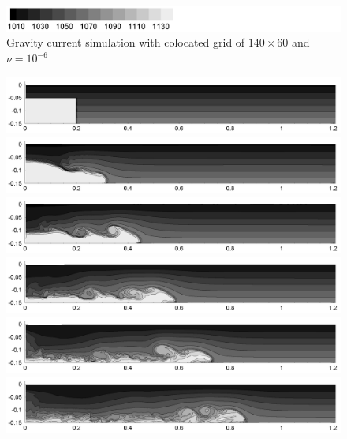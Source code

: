 \begin{figure}[htbp]
\begin{center}
\includegraphics[scale=0.55]{../figures/colocated/Fig9case/label.png}
    \caption{Gravity current simulation with colocated grid of $140 \times 60$ and $\nu=10^{-6}$}
    \label{fig:140-60-03-VE-6}
  \end{center}
\end{figure}



\begin{figure}[htbp]
  \begin{center}    \includegraphics[scale=0.55]{../figures/colocated/Fig9case/280-120-0075-V5E-7-Surf0/01.png}    \includegraphics[scale=0.55]{../figures/colocated/Fig9case/280-120-0075-V5E-7-Surf0/02.png}
\includegraphics[scale=0.55]{../figures/colocated/Fig9case/280-120-0075-V5E-7-Surf0/03.png}
\includegraphics[scale=0.55]{../figures/colocated/Fig9case/280-120-0075-V5E-7-Surf0/04.png}    \includegraphics[scale=0.55]{../figures/colocated/Fig9case/280-120-0075-V5E-7-Surf0/05.png}
\includegraphics[scale=0.55]{../figures/colocated/Fig9case/280-120-0075-V5E-7-Surf0/06.png}

\end{center}
\end{figure}
